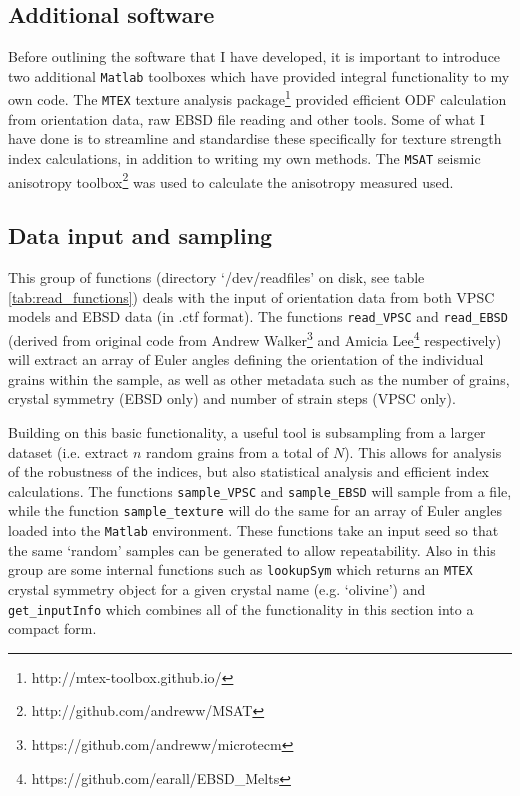 \documentclass[a4paper,12pt,twoside]{report}
\numberwithin{equation}{chapter}
\begin{document}
\subsection{Additional software}
Before outlining the software that I have developed, it is important to introduce two additional \texttt{Matlab} toolboxes which have provided integral functionality to my own code. The \texttt{MTEX} texture analysis package\footnote{http://mtex-toolbox.github.io/} \citep{Bachmann2010,Mainprice} provided efficient ODF calculation from orientation data, raw EBSD file reading and other tools. Some of what I have done is to streamline and standardise these specifically for texture strength index calculations, in addition to writing my own methods. The \texttt{MSAT} seismic anisotropy toolbox\footnote{http://github.com/andreww/MSAT} \citep{Walker} was used to calculate the anisotropy measured used.    

\subsection{Data input and sampling}

This group of functions (directory \lq{}/dev/readfiles\rq{} on disk, see table \ref{tab:read_functions}) deals with the input of orientation data from both VPSC models and EBSD data (in .ctf format). The functions \texttt{read\_{}VPSC} and \texttt{read\_{}EBSD} (derived from original code from  Andrew Walker\footnote{https://github.com/andreww/microtecm} and Amicia Lee\footnote{https://github.com/earall/EBSD\_{}Melts} respectively) will extract an array of Euler angles defining the orientation of the individual grains within the sample, as well as other metadata such as the number of grains, crystal symmetry (EBSD only) and number of strain steps (VPSC only).                                                

Building on this basic functionality, a useful tool is subsampling from a larger dataset (i.e. extract $n$ random grains from a total of $N$). This allows for analysis of the robustness of the indices, but also statistical analysis and efficient index calculations. The functions \texttt{sample\_{}VPSC} and \texttt{sample\_{}EBSD} will sample from a file, while the function \texttt{sample\_{}texture} will do the same for an array of Euler angles loaded into the \texttt{Matlab} environment. These functions take an input seed so that the same \lq{}random\rq{} samples can be generated to allow repeatability. Also in this group are some internal functions such as \texttt{lookupSym} which returns an \texttt{MTEX} crystal symmetry object \citep{Bachmann2010} for a given crystal name (e.g. \lq{}olivine\rq{}) and \texttt{get\_{}inputInfo} which combines all of the functionality in this section into a compact form.                                                                                                                            
\end{document}
